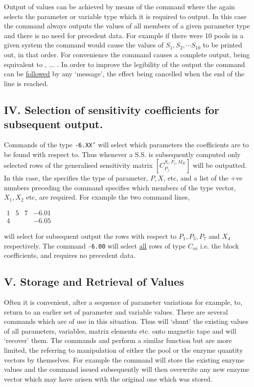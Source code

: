 Output of values can be achieved by means of the command  where the  again selects the parameter or variable type which it is required to output. In this case the command always outputs the values of all members of a given parameter type and there is no need for precedent data. For example if there were 10 pools in a given system the command  would cause the values of $S_{1}, S_{2}, \cdots S_{10}$ to be printed out, in that order. For convenience the command  causes a complete output, being equivalent to ,  $\ldots$ . In order to improve the legibility of the output the command  can be \underline{followed} by any `message', the effect being cancelled when the end of the line is reached.

\subsection*{IV. Selection of sensitivity coefficients for subsequent output.}

Commands of the type {\tt \textquotesingle -6.XX'} will select which parameters the coefficients are to be found with respect to. Thus whenever a S.S. is subsequently computed only selected rows of the generalised sensitivity matrix $\left[C_{P_j}^{S_{i}, F_j, M_{K}}\right]$ will be outputted. In this case, the  specifies the type of parameter, $P, X$, etc, and a list of the +ve numbers preceding the command specifies which members of the type vector, $X_{1}, X_{2}$ etc, are required. For example the two command lines,

$\begin{array}{llll}1 & 5 & 7 & -6.01 \\ 4 & & &-6.05\end{array}$

will select for subsequent output the rows with respect to $P_{1}, P_{5}, P_{7}$ and $X_{4}$ respectively. The command {\tt -6.00} will select \underline{all} rows of type $C_{\alpha i} $ i.e. the block coefficients, and requires no precedent data.

\subsection*{V. Storage and Retrieval of Values}

Often it is convenient, after a sequence of parameter variations for example, to, return to an earlier set of parameter and variable values. There are several commands which are of use in this situation. Thus  will `shunt' the existing values of all parameters, variables, matrix elements etc. onto magnetic tape and  will `recover' them. The commands  and  perform a similar function but are more limited, the  referring to manipulation of either the pool or the enzyme quantity vectors by themselves. For example the command  will store the existing enzyme values and the command  issued subsequently will then overwrite any new enzyme vector which may have arisen with the original one which was stored.

